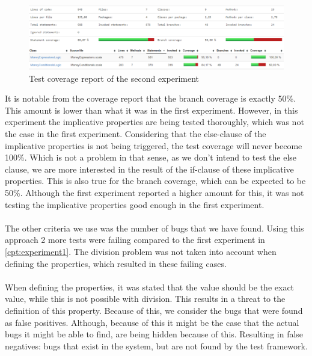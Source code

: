 \begin{figure}[!ht]
	\includegraphics[width=\linewidth]{figures/eval_e2}
\caption{Test coverage report of the second experiment}
\label{fig:experiment2_eval_e2}
\centering
\end{figure}
\FloatBarrier\noindent
It is notable from the coverage report that the branch coverage is exactly 50\%. This amount is lower than what it was in the first experiment. However, in this experiment the implicative properties are being tested thoroughly, which was not the case in the first experiment. Considering that the
else-clause of the implicative properties is not being triggered, the test
coverage will never become 100\%. Which is not a problem in that sense, as we
don't intend to test the else clause, we are more interested in the result of
the if-clause of these implicative properties. This is also true for the branch coverage, which can be expected to be 50\%. Although the first experiment reported a higher amount for this, it was not testing the implicative properties good enough in the first experiment.\\
\\
The other criteria we use was the number of bugs that we have found. Using this
approach 2 more tests were failing compared to the first experiment in
\autoref{cpt:experiment1}. The division problem was not taken into account when
defining the properties, which resulted in these failing cases.\\
\\
When defining the properties, it was stated that the value should be the exact
value, while this is not possible with division. This results in a threat to the
definition of this property. Because of this, we consider the bugs that were
found as false positives. Although, because of this it might be the case that
the actual bugs it might be able to find, are being hidden because of this.
Resulting in false negatives: bugs that exist in the system, but are not found
by the test framework.

